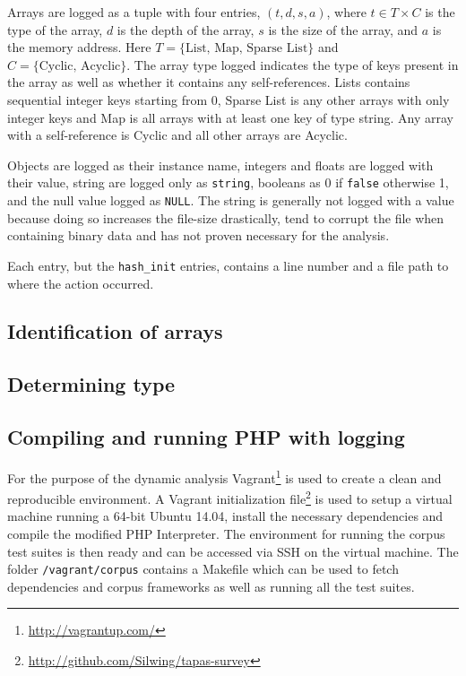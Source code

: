 Arrays are logged as a tuple with four entries, $(t,d,s,a)$, where $t\in T\times C$ is the type of the array, $d$ is the depth of the array, $s$ is the size of the array, and $a$ is the memory address. Here $T = \{\text{List, Map, Sparse List}\}$ and $C = \{\text{Cyclic, Acyclic}\}$. The array type logged indicates the type of keys present in the array as well as whether it contains any self-references. Lists contains sequential integer keys starting from 0, Sparse List is any other arrays with only integer keys and Map is all arrays with at least one key of type string. Any array with a self-reference is Cyclic and all other arrays are Acyclic.

Objects are logged as their instance name, integers and floats are logged with their value, string are logged only as \texttt{string}, booleans as $0$ if \texttt{false} otherwise 1, and the null value logged as \texttt{NULL}. The string is generally not logged with a value because doing so increases the file-size drastically, tend to corrupt the file when containing binary data and has not proven necessary for the analysis.

Each entry, but the \texttt{hash\_init} entries, contains a line number and a file path to where the action occurred. 

\subsection{Identification of arrays}


\subsection{Determining type}


\subsection{Compiling and running PHP with logging}
For the purpose of the dynamic analysis Vagrant\footnote{\url{http://vagrantup.com/}} is used to create a clean and reproducible environment. A Vagrant initialization file\footnote{\url{http://github.com/Silwing/tapas-survey}} is used to setup a virtual machine running a 64-bit Ubuntu 14.04, install the necessary dependencies and compile the modified PHP Interpreter. The environment for running the corpus test suites is then ready and can be accessed via SSH on the virtual machine. The folder \texttt{/vagrant/corpus} contains a Makefile which can be used to fetch dependencies and corpus frameworks as well as running all the test suites.


